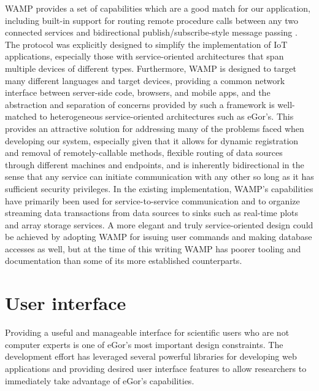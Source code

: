 \documentclass[../thesis]{subfiles}
\begin{document}
\gls{WAMP} provides a set of capabilities which are a good match for
our application, including built-in support for routing remote
procedure calls between any two connected services and bidirectional
publish/subscribe-style message passing \cite{WAMP}. The protocol was
explicitly designed to simplify the implementation of \gls{IoT}
applications, especially those with service-oriented architectures
that span multiple devices of different types. Furthermore, \gls{WAMP} is
designed to target many different languages and target devices,
providing a common network interface between server-side code,
browsers, and mobile apps, and the abstraction and separation of
concerns provided by such a framework is well-matched to heterogeneous
service-oriented architectures such as eGor's. This provides an
attractive solution for addressing many of the problems faced when
developing our system, especially given that it allows for dynamic
registration and removal of remotely-callable methods, flexible
routing of data sources through different machines and endpoints, and
is inherently bidirectional in the sense that any service can initiate
communication with any other so long as it has sufficient security
privileges. In the existing implementation, \gls{WAMP}'s capabilities
have primarily been used for service-to-service communication and to
organize streaming data transactions from data sources to sinks such
as real-time plots and array storage services. A more elegant and
truly service-oriented design could be achieved by adopting \gls{WAMP}
for issuing user commands and making database accesses as well, but at
the time of this writing \gls{WAMP} has poorer tooling and
documentation than some of its more established counterparts.



\section{User interface}
Providing a useful and manageable interface for scientific users who
are not computer experts is one of eGor's most important design
constraints. The development effort has leveraged several powerful
libraries for developing web applications and providing desired user
interface features to allow researchers to immediately take advantage
of eGor's capabilities.
\end{document}
